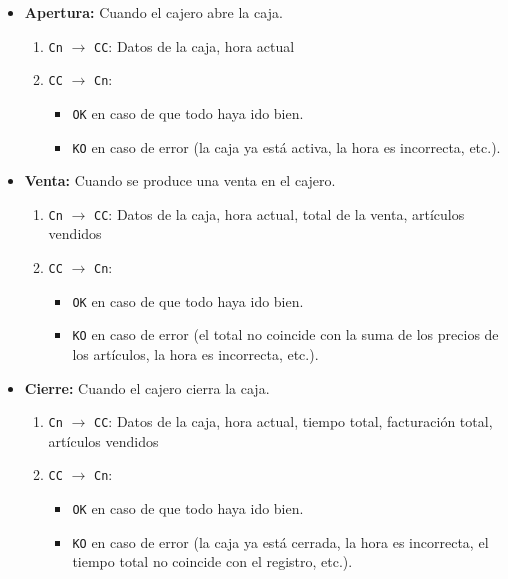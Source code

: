 \begin{itemize}
    \item \textbf{Apertura:} Cuando el cajero abre la caja.
    \begin{enumerate}
        \item \texttt{Cn} $\rightarrow$ \texttt{CC}: Datos de la caja, hora actual
        \item \texttt{CC} $\rightarrow$ \texttt{Cn}: 
        \begin{itemize}
            \item \texttt{OK} en caso de que todo haya ido bien.
            \item \texttt{KO} en caso de error (la caja ya está activa, la hora es incorrecta, etc.).
        \end{itemize}
    \end{enumerate}

    \item \textbf{Venta:} Cuando se produce una venta en el cajero.
    \begin{enumerate}
        \item \texttt{Cn} $\rightarrow$ \texttt{CC}: Datos de la caja, hora actual, total de la venta, artículos vendidos
        \item \texttt{CC} $\rightarrow$ \texttt{Cn}: 
        \begin{itemize}
            \item \texttt{OK} en caso de que todo haya ido bien.
            \item \texttt{KO} en caso de error (el total no coincide con la suma de los precios de los artículos, la hora es incorrecta, etc.).
        \end{itemize}
    \end{enumerate}
    
    \item \textbf{Cierre:} Cuando el cajero cierra la caja.
    \begin{enumerate}
        \item \texttt{Cn} $\rightarrow$ \texttt{CC}: Datos de la caja, hora actual, tiempo total, facturación total, artículos vendidos
        \item \texttt{CC} $\rightarrow$ \texttt{Cn}: 
        \begin{itemize}
            \item \texttt{OK} en caso de que todo haya ido bien.
            \item \texttt{KO} en caso de error (la caja ya está cerrada, la hora es incorrecta, el tiempo total no coincide con el registro, etc.).
        \end{itemize}
    \end{enumerate}
    

\end{itemize}
